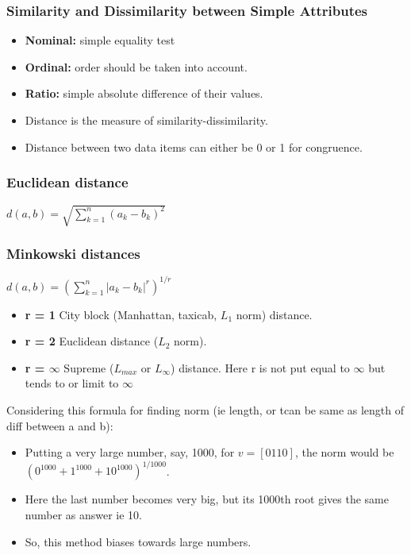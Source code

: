 \begin{frame}[fragile]\frametitle{Similarity and Dissimilarity between Simple Attributes}

		\begin{itemize}
			\item{\bf Nominal:} simple equality test
			\item{\bf Ordinal:} order should be taken into account.
			\item{\bf Ratio:} simple absolute difference of their values.
			\item Distance is the measure of similarity-dissimilarity. 
			\item Distance between two data items can either be 0 or 1 for congruence.
\end{itemize}

\end{frame}

\begin{frame}[fragile]\frametitle{Euclidean distance} 
$d(a,b) = \sqrt{\sum_{k=1}^{n} (a_k - b_k)^{2}}$
\end{frame}

\begin{frame}[fragile]\frametitle{Minkowski distances}

$d(a,b) = \left(\sum_{k=1}^{n} |a_k - b_k|^{r}\right) ^{1/r}$

	\begin{itemize}
		\item {\bf r = 1} City block (Manhattan, taxicab, $L_{1}$ norm) distance.
		\item {\bf r = 2} Euclidean distance ($L_{2}$ norm).
		\item {\bf r = $\infty$} Supreme ($L_{max}$ or $L_{\infty}$) distance. Here r is not put equal to $\infty$ but tends to or limit to $\infty$
\end{itemize}

Considering this formula for finding norm (ie length, or tcan be same as length of diff between a and b):

	\begin{itemize}
		\item Putting a very large number, say, 1000, for $v=[0 1 10]$, the norm would be $(0^{1000} + 1^{1000} + 10^{1000})^{1/1000}$. 
		\item Here the last number becomes very big, but its 1000th root gives the same number as answer ie 10. 

		\item So, this method biases towards large numbers.
\end{itemize}
		
\end{frame}

